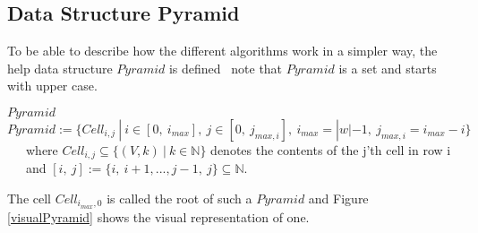\subsection{Data Structure Pyramid} \label{dataStructurePyramid}
To be able to describe how the different algorithms work in a simpler way, the help data structure $Pyramid$ is defined \textendash~note that $Pyramid$ is a set and starts with upper case.
\begin{DefGrey} \textbf{$Pyramid$} \\
	$Pyramid :=\{ Cell_{i,j}\ |\ i \in [0,\ i_{max}],\  j \in [0,\ j_{max,i}],\ i_{max} = |w|-1,~j_{max,i} = i_{max} -i\}$\\
	~~~where $Cell_{i,j} \subseteq \{(V,k)~|~k \in \mathbb{N} \}$ denotes the contents of the j'th cell in row i\\
	~~~and $[i,\ j] := \{i,\ i+1,..., j-1,\ j\} \subseteq \mathbb{N}$.
\end{DefGrey}
\noindent The cell $Cell_{i_{max},0}$ is called the root of such a $Pyramid$ and Figure \ref{visualPyramid} shows the visual representation of one.
\newcommand{\boxpyramid}[1]{
	\fontsize{5}{12}\selectfont{#1}
}
